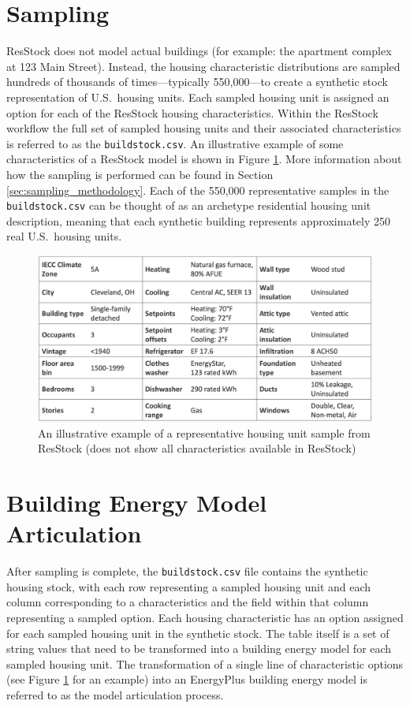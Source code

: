 \section{Sampling}
ResStock does not model actual buildings (for example: the apartment complex at 123 Main Street). Instead, the housing characteristic distributions are sampled hundreds of thousands of times---typically 550,000---to create a synthetic stock representation of U.S.~housing units. Each sampled housing unit is assigned an option for each of the ResStock housing characteristics. Within the ResStock workflow the full set of sampled housing units and their associated characteristics is referred to as the \texttt{buildstock.csv}. An illustrative example of some characteristics of a ResStock model is shown in Figure \ref{fig:illustrative_sample}. More information about how the sampling is performed can be found in Section \ref{sec:sampling_methodology}. Each of the 550,000 representative samples in the \texttt{buildstock.csv} can be thought of as an archetype residential housing unit description, meaning that each synthetic building represents approximately 250 real U.S.~housing units.

\begin{figure}
    \centering
    \includegraphics[width=1\linewidth]{images/illustrative_sample.png}
    \caption{An illustrative example of a representative housing unit sample from ResStock (does not show all characteristics available in ResStock)}
    \label{fig:illustrative_sample}
\end{figure}

\section{Building Energy Model Articulation} \label{sec:bem_articulation}
After sampling is complete, the \texttt{buildstock.csv} file contains the synthetic housing stock, with each row representing a sampled housing unit and each column corresponding to a characteristics and the field within that column representing a sampled option. Each housing characteristic has an option assigned for each sampled housing unit in the synthetic stock. The table itself is a set of string values that need to be transformed into a building energy model for each sampled housing unit. The transformation of a single line of characteristic options (see Figure \ref{fig:illustrative_sample} for an example) into an EnergyPlus building energy model is referred to as the model articulation process.

